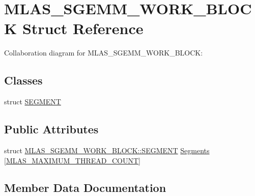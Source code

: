 \hypertarget{structMLAS__SGEMM__WORK__BLOCK}{}\section{M\+L\+A\+S\+\_\+\+S\+G\+E\+M\+M\+\_\+\+W\+O\+R\+K\+\_\+\+B\+L\+O\+CK Struct Reference}
\label{structMLAS__SGEMM__WORK__BLOCK}


Collaboration diagram for M\+L\+A\+S\+\_\+\+S\+G\+E\+M\+M\+\_\+\+W\+O\+R\+K\+\_\+\+B\+L\+O\+CK\+:
\subsection*{Classes}
\begin{DoxyCompactItemize}
\item 
struct \mbox{\hyperlink{structMLAS__SGEMM__WORK__BLOCK_1_1SEGMENT}{S\+E\+G\+M\+E\+NT}}
\end{DoxyCompactItemize}
\subsection*{Public Attributes}
\begin{DoxyCompactItemize}
\item 
struct \mbox{\hyperlink{structMLAS__SGEMM__WORK__BLOCK_1_1SEGMENT}{M\+L\+A\+S\+\_\+\+S\+G\+E\+M\+M\+\_\+\+W\+O\+R\+K\+\_\+\+B\+L\+O\+C\+K\+::\+S\+E\+G\+M\+E\+NT}} \mbox{\hyperlink{structMLAS__SGEMM__WORK__BLOCK_a1fe99553413b4318ea08f8c73e437ae3}{Segments}} \mbox{[}\mbox{\hyperlink{mlasi_8h_a86466d6811df85b69801ae746e3ad493}{M\+L\+A\+S\+\_\+\+M\+A\+X\+I\+M\+U\+M\+\_\+\+T\+H\+R\+E\+A\+D\+\_\+\+C\+O\+U\+NT}}\mbox{]}
\end{DoxyCompactItemize}


\subsection{Member Data Documentation}
\mbox{\label{structMLAS__SGEMM__WORK__BLOCK_a1fe99553413b4318ea08f8c73e437ae3}} 
